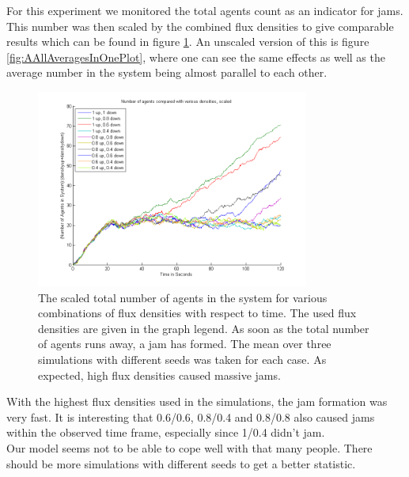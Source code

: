 
\noi For this experiment we monitored the total agents count as an indicator for jams. This number was then scaled by the combined flux densities to give comparable results which can be found in figure \ref{fig:AAllAveragesScaled}. An unscaled version of this is figure \ref{fig:AAllAveragesInOnePlot}, where one can see the same effects as well as the average number in the system being almost parallel to each other.\\
\begin{figure}[h!]
	\centering
		\includegraphics[width=0.80\textwidth]{pictures/AAllAveragesScaled.png}
	\caption{The scaled total number of agents in the system for various combinations of flux densities with respect to time. The used flux densities are given in the graph legend. As soon as the total number of agents runs away, a jam has formed. The mean over three simulations with different seeds was taken for each case. As expected, high flux densities caused massive jams.}
	\label{fig:AAllAveragesScaled}
\end{figure}

\noi With the highest flux densities used in the simulations, the jam formation was very fast. It is interesting that 0.6/0.6, 0.8/0.4 and 0.8/0.8 also caused jams within the observed time frame, especially since 1/0.4 didn't jam.\\
Our model seems not to be able to cope well with that many people. There should be more simulations with different seeds to get a better statistic.\\

